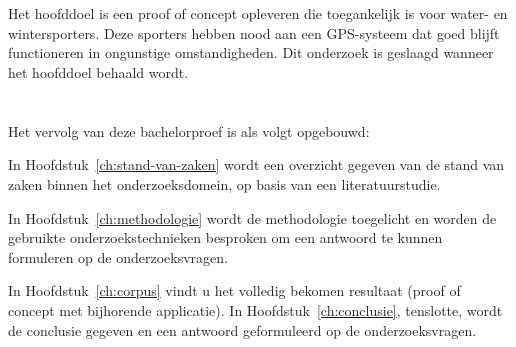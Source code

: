 \section{}
\label{sec:onderzoeksdoelstelling}
Het hoofddoel is een proof of concept opleveren die toegankelijk is voor water- en wintersporters. Deze sporters hebben nood aan een GPS-systeem dat goed blijft functioneren in ongunstige omstandigheden. Dit onderzoek is geslaagd wanneer het hoofddoel behaald wordt.


\section{}
\label{sec:opzet-bachelorproef}


Het vervolg van deze bachelorproef is als volgt opgebouwd:

In Hoofdstuk~\ref{ch:stand-van-zaken} wordt een overzicht gegeven van de stand van zaken binnen het onderzoeksdomein, op basis van een literatuurstudie.

In Hoofdstuk~\ref{ch:methodologie} wordt de methodologie toegelicht en worden de gebruikte onderzoekstechnieken besproken om een antwoord te kunnen formuleren op de onderzoeksvragen.


In Hoofdstuk~\ref{ch:corpus} vindt u het volledig bekomen resultaat (proof of concept met bijhorende applicatie).
\newline
\newline
In Hoofdstuk~\ref{ch:conclusie}, tenslotte, wordt de conclusie gegeven en een antwoord geformuleerd op de onderzoeksvragen.